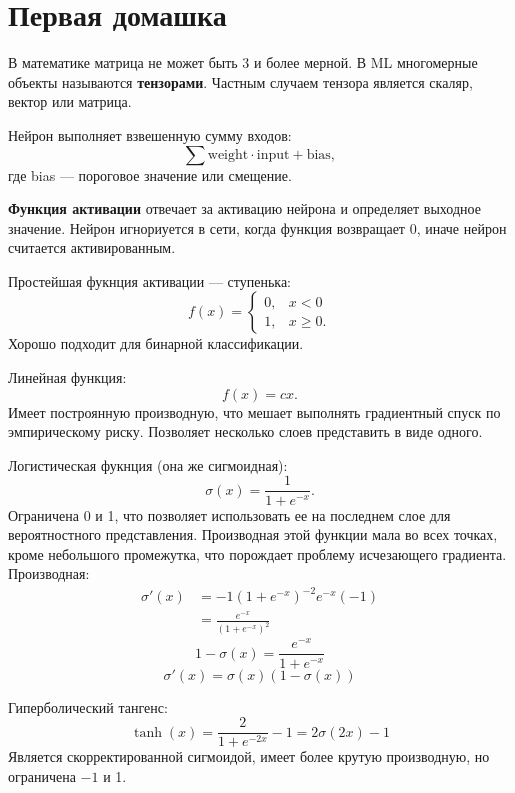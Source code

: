 




\section{Первая домашка}

В математике матрица не может быть 3 и более мерной. В ML многомерные объекты
называются \textbf{тензорами}. Частным случаем тензора является скаляр, вектор
или матрица.

Нейрон выполняет взвешенную сумму входов:
\[
    \sum \text{weight} \cdot \text{input} + \text{bias},
\] где bias --- пороговое значение или смещение.

\textbf{Функция активации} отвечает за активацию нейрона и определяет выходное
значение. Нейрон игнориуется в сети, когда функция возвращает 0, иначе нейрон
считается активированным.

Простейшая фукнция активации --- ступенька:
\[
    f(x) = \begin{cases}
        0, & x < 0 \\
        1, & x \geq 0.
    \end{cases}
\]
Хорошо подходит для бинарной классификации.

Линейная функция:
\[
    f(x) = c x.
\]
Имеет построянную производную, что мешает выполнять градиентный спуск по
эмпирическому риску. Позволяет несколько слоев представить в виде одного.

Логистическая фукнция (она же сигмоидная):
\[
    \sigma(x) = \frac{1}{1 + e^{-x}}.
\]
Ограничена 0 и 1, что позволяет использовать ее на последнем слое для
вероятностного представления. Производная этой функции мала во всех точках,
кроме небольшого промежутка, что порождает проблему исчезающего градиента.
Производная:
\begin{align*}
    \sigma'(x) &= -1 (1 + e^{-x})^{-2} e^{-x} (-1) \\
    &= \frac{e^{-x}}{(1 +
    e^{-x})^2}
\end{align*}
\[
    1 - \sigma(x) = \frac{e^{-x}}{1 + e^{-x}}
\]
\[
    \sigma'(x) = \sigma(x) (1 - \sigma(x))
\]

Гиперболический тангенс:
\[
    \tanh(x) = \frac{2}{1 + e^{-2x}} - 1 = 2 \sigma(2x) - 1
\]
Является скорректированной сигмоидой, имеет более крутую производную, но
ограничена $-1$ и 1.

